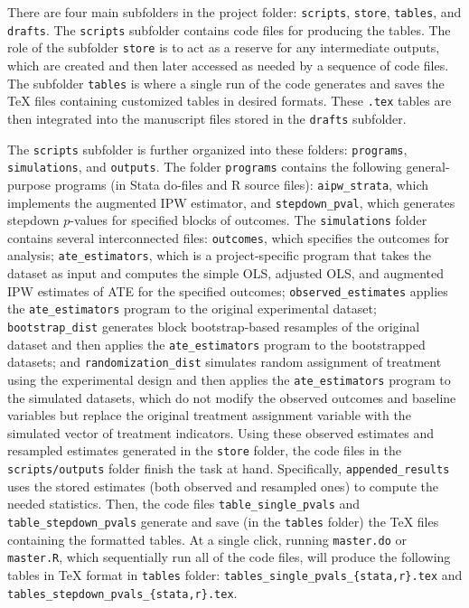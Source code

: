 \documentclass[12pt]{article}
\begin{document}
There are four main subfolders in the project folder: \texttt{scripts}, \texttt{store}, \texttt{tables}, and \texttt{drafts}. The \texttt{scripts} subfolder contains code files for producing the tables. The role of the subfolder \texttt{store} is to act as a reserve for any intermediate outputs, which are created and then later accessed as needed by a sequence of code files. The subfolder \texttt{tables} is where a single run of the code generates and saves the TeX files containing customized tables in desired formats. These \texttt{.tex} tables are then integrated into the manuscript files stored in the \texttt{drafts} subfolder.

The \texttt{scripts} subfolder is further organized into these folders: \texttt{programs}, \texttt{simulations}, and \texttt{outputs}. The folder \texttt{programs} contains the following general-purpose programs (in Stata do-files and R source files): \texttt{aipw\_strata}, which implements the augmented IPW estimator, and \texttt{stepdown\_pval}, which generates stepdown $p$-values for specified blocks of outcomes. The \texttt{simulations} folder contains several interconnected files: \texttt{outcomes}, which specifies the outcomes for analysis; \texttt{ate\_estimators}, which is a project-specific program that takes the dataset as input and computes the simple OLS, adjusted OLS, and augmented IPW estimates of ATE for the specified outcomes; \texttt{observed\_estimates} applies the \texttt{ate\_estimators} program to the original experimental dataset; \texttt{bootstrap\_dist} generates block bootstrap-based resamples of the original dataset and then applies the \texttt{ate\_estimators} program to the bootstrapped datasets; and \texttt{randomization\_dist} simulates random assignment of treatment using the experimental design and then applies the \texttt{ate\_estimators} program to the simulated datasets, which do not modify the observed outcomes and baseline variables but replace the original treatment assignment variable with the simulated vector of treatment indicators. Using these observed estimates and resampled estimates generated in the \texttt{store} folder, the code files in the \texttt{scripts/outputs} folder finish the task at hand. Specifically, \texttt{appended\_results} uses the stored estimates (both observed and resampled ones) to compute the needed statistics. Then, the code files \texttt{table\_single\_pvals} and \texttt{table\_stepdown\_pvals} generate and save (in the \texttt{tables} folder) the TeX files containing the formatted tables. At a single click, running \texttt{master.do} or \texttt{master.R}, which sequentially run all of the code files, will produce the following tables in TeX format in \texttt{tables} folder: \texttt{tables\_single\_pvals\_\{stata,r\}.tex} and \texttt{tables\_stepdown\_pvals\_\{stata,r\}.tex}.
\end{document}
